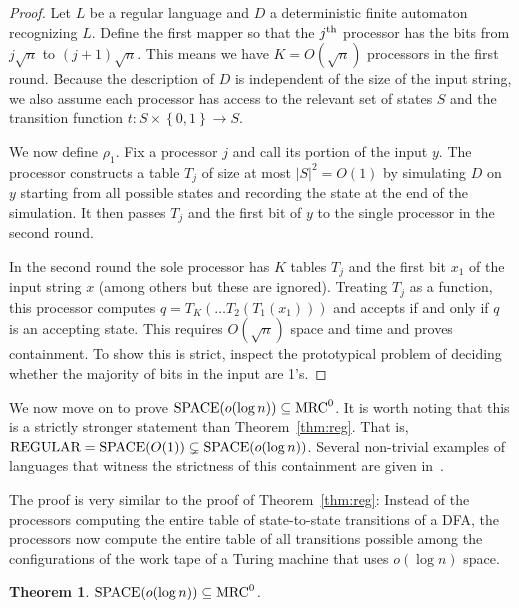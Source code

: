\documentclass[11pt]{article}
\newtheorem{theorem}{Theorem}
\theoremstyle{definition}
\theoremstyle{remark}
\newcommand{\mrc}{\textup{MRC}}
\newcommand{\SPACE}{\textup{SPACE}}
\begin{document}
\begin{proof}
Let $L$ be a regular language and $D$ a deterministic finite automaton
recognizing $L$. Define the first mapper so
that the $j^\textup{th}$ processor has the bits from $j\sqrt{n}$ to
$(j+1)\sqrt{n}$. This means we have $K = O(\sqrt{n})$ processors in the first
round. Because the description of $D$ is independent of the size of the input
string, we also assume each processor has access to the relevant set of states
$S$ and the transition function $t: S \times \left \{ 0,1 \right \} \to S$.

We now define $\rho_1$. Fix a processor $j$ and call its portion of the input
$y$. The processor constructs a table $T_j$ of size at most $|S|^2 = O(1)$ by
simulating $D$ on $y$ starting from all possible states and recording the state
at the end of the simulation. It then passes $T_j$ and the first bit of $y$ to
the single processor in the second round.

In the second round the sole processor has $K$ tables $T_j$ and the first bit
$x_1$ of the input string $x$ (among others but these are ignored). Treating
$T_j$ as a function, this processor computes $q = T_K(\dots T_2(T_1(x_1)))$ and
accepts if and only if $q$ is an accepting state. This requires $O(\sqrt{n})$
space and time and proves containment. To show this is strict, inspect the
prototypical problem of deciding whether the majority of bits in the input are
1's.
\end{proof}

We now move on to prove $\SPACE(o(\log n))\subseteq \mrc^0$. It is worth noting
that this is a strictly stronger statement than Theorem~\ref{thm:reg}. That
is, $\textup{REGULAR}=\SPACE(O(1))\subsetneq \SPACE(o(\log n))$. Several
non-trivial examples of languages that witness the strictness of this
containment are given in~\cite{szepietowski1994turing}.

The proof is very similar to the proof of Theorem~\ref{thm:reg}:  Instead of
the processors computing the entire table of state-to-state transitions of a
DFA, the processors now compute the entire table of all transitions possible
among the configurations of the work tape of a Turing machine that uses $o(\log
n)$ space.

\begin{theorem} \label{thm:sublogspace}
$\textup{SPACE}(o(\log n))\subseteq \mrc^0$.
\end{theorem}
\end{document}
